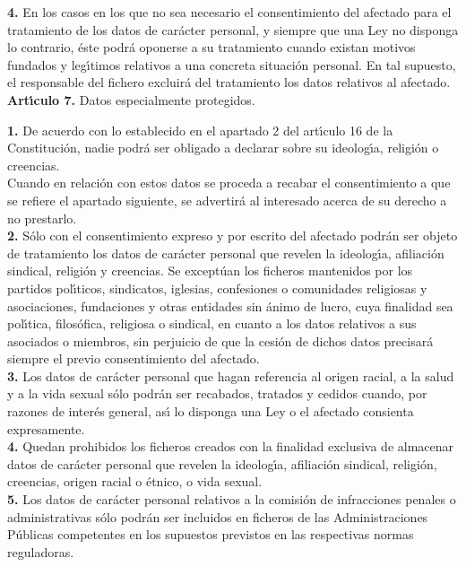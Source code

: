 {\bf 4.} En los casos en los que no sea necesario el consentimiento del 
afectado para el tratamiento de los datos de car\'acter personal, y siempre que 
una Ley no disponga lo contrario, \'este podr\'a oponerse a su tratamiento 
cuando existan motivos fundados y leg\'{\i}timos relativos a una concreta 
situaci\'on personal. En tal supuesto, el responsable del fichero excluir\'a 
del tratamiento los datos relativos al afectado.
\vspace{0.3cm}\\
{\large {\bf Art\'{\i}culo 7.} Datos especialmente protegidos.}

{\bf 1.} De acuerdo con lo establecido en el apartado 2 del art\'{\i}culo 16 de 
la Constituci\'on, nadie podr\'a ser obligado a declarar sobre su 
ideolog\'{\i}a, religi\'on o creencias.\\
Cuando en relaci\'on con estos datos se proceda a recabar el consentimiento a 
que se refiere el apartado siguiente, se advertir\'a al interesado acerca de su 
derecho a no prestarlo.\\

{\bf 2.} S\'olo con el consentimiento expreso y por escrito del afectado 
podr\'an ser objeto de tratamiento los datos de car\'acter personal que revelen 
la ideolog\'{\i}a, afiliaci\'on sindical, religi\'on y creencias. Se 
except\'uan los ficheros mantenidos por los partidos pol\'{\i}ticos,
sindicatos, iglesias, confesiones o comunidades religiosas y asociaciones,
fundaciones y otras entidades sin \'animo de lucro, cuya finalidad sea 
pol\'{\i}tica, filos\'ofica, religiosa o sindical, en cuanto a los datos 
relativos a sus asociados o miembros, sin perjuicio de que la cesi\'on de 
dichos datos precisar\'a siempre el previo consentimiento del afectado.\\

{\bf 3.} Los datos de car\'acter personal que hagan referencia al origen racial,
a la salud y a la vida sexual s\'olo podr\'an ser recabados, tratados y cedidos 
cuando, por razones de inter\'es general, as\'{\i} lo disponga una Ley o el 
afectado consienta expresamente.\\

{\bf 4.} Quedan prohibidos los ficheros creados con la finalidad exclusiva de 
almacenar datos de car\'acter personal que revelen la ideolog\'{\i}a, 
afiliaci\'on sindical, religi\'on, creencias, origen racial o \'etnico, o vida 
sexual.\\

{\bf 5.} Los datos de car\'acter personal relativos a la comisi\'on de 
infracciones penales o administrativas s\'olo podr\'an ser incluidos en 
ficheros de las Administraciones P\'ublicas competentes en los supuestos 
previstos en las respectivas normas reguladoras.\\

